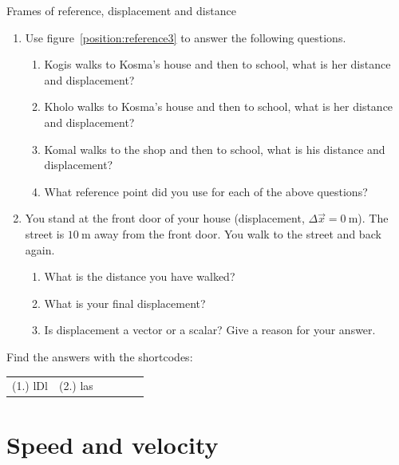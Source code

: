 \begin{exercises}{Frames of reference, displacement and distance}
            \nopagebreak \noindent
        \label{m38788*id64042}\begin{enumerate}[noitemsep, label=\textbf{\arabic*}. ] 
            \label{m38788*uid20}\item Use figure~\ref{position:reference3}  to answer the following questions.
\label{m38788*id64060}\begin{enumerate}[noitemsep, label=\textbf{\alph*}. ] 
            \label{m38788*uid21}\item Kogis walks to Kosma's house and then to school, what is her distance and displacement?
\label{m38788*uid22}\item Kholo walks to Kosma's house and then to school, what is her distance and displacement?
\label{m38788*uid23}\item Komal walks to the shop and then to school, what is his distance and displacement?
\label{m38788*uid24}\item What reference point did you use for each of the above questions?
\end{enumerate}
                \label{m38788*uid25}\item You stand at the front door of your house (displacement, $\Delta \vec{x}=0~\text{m}$). The street is $10~\text{m}$ away from the front door. You walk to the street and back again.
\label{m38788*id64141}\begin{enumerate}[noitemsep, label=\textbf{\alph*}. ] 
            \label{m38788*uid26}\item What is the distance you have walked?
\label{m38788*uid27}\item What is your final displacement?
\label{m38788*uid28}\item Is displacement a vector or a scalar? Give a reason for your answer.
\end{enumerate}
                \end{enumerate}
  \label{m38788**end}
\par {} Find the answers with the shortcodes:
 \par \begin{tabular}[h]{cccccc}
 (1.) lDl  &  (2.) las  & \end{tabular}
\end{exercises}
         \section{Speed and velocity} 
    \nopagebreak

